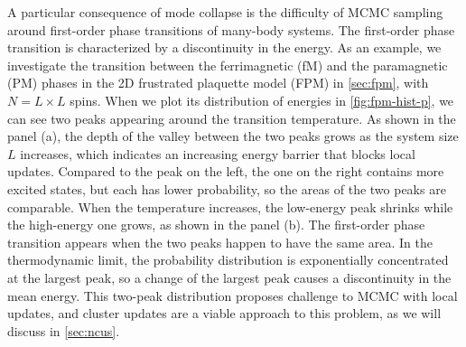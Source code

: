 A particular consequence of mode collapse is the difficulty of MCMC sampling around first-order phase transitions of many-body systems. The first-order phase transition is characterized by a discontinuity in the energy. As an example, we investigate the transition between the ferrimagnetic (fM) and the paramagnetic (PM) phases in the 2D frustrated plaquette model (FPM) in \cref{sec:fpm}, with $N = L \times L$ spins. When we plot its distribution of energies in \cref{fig:fpm-hist-p}, we can see two peaks appearing around the transition temperature. As shown in the panel (a), the depth of the valley between the two peaks grows as the system size $L$ increases, which indicates an increasing energy barrier that blocks local updates. Compared to the peak on the left, the one on the right contains more excited states, but each has lower probability, so the areas of the two peaks are comparable. When the temperature increases, the low-energy peak shrinks while the high-energy one grows, as shown in the panel (b). The first-order phase transition appears when the two peaks happen to have the same area. In the thermodynamic limit, the probability distribution is exponentially concentrated at the largest peak, so a change of the largest peak causes a discontinuity in the mean energy. This two-peak distribution proposes challenge to MCMC with local updates, and cluster updates are a viable approach to this problem, as we will discuss in \cref{sec:ncus}.
